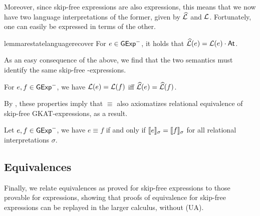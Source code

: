 \documentclass[orivec,envcountsect,envcountsame]{llncs}
\begin{document}
Moreover, since skip-free \GKAT expressions are also \GKAT expressions, this means that we now have two language interpretations of the former, given by $\widehat{\mathcal{L}}$ and $\mathcal{L}$.
Fortunately, one can easily be expressed in terms of the other.

\begin{restatable}{lemma}{restatelanguagerecover}%
\label{lemma:language-recover}
For $e \in \mathsf{GExp}^-$, it holds that $\widehat{\mathcal{L}}(e) = \mathcal{L}(e) \cdot \mathsf{At}$.
\end{restatable}

As an easy consequence of the above, we find that the two semantics must identify the same skip-free \GKAT-expressions.

\begin{lemma}
For $e, f \in \mathsf{GExp}^-$, we have $\mathcal{L}(e) = \mathcal{L}(f)$ iff $\widehat{\mathcal{L}}(e) = \widehat{\mathcal{L}}(f)$.
\end{lemma}

By , these properties imply that $\equiv$ also axiomatizes relational equivalence of skip-free GKAT-expressions, as a result.

\begin{corollary}
Let $e, f \in \mathsf{GExp}^-$, we have $e \equiv f$ if and only if $\llbracket e\rrbracket_\sigma = \llbracket f\rrbracket_\sigma$ for all relational interpretations $\sigma$.
\end{corollary}

\subsection{Equivalences}%
\label{section:lift-equivalences}
Finally, we relate equivalences as proved for skip-free \GKAT expressions to those provable for \GKAT expressions, showing that proofs of equivalence for skip-free \GKAT expressions can be replayed in the larger calculus, without (\textsf{UA}).
\end{document}
